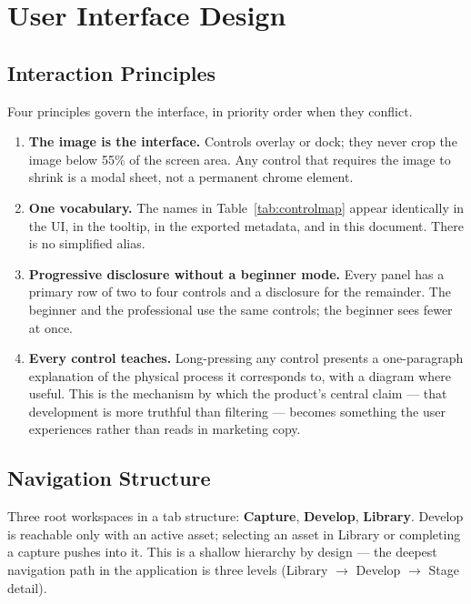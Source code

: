 \section{User Interface Design}
\label{sec:ui}

\subsection{Interaction Principles}

Four principles govern the interface, in priority order when they conflict.

\begin{enumerate}
\item \textbf{The image is the interface.} Controls overlay or dock; they never
crop the image below 55\% of the screen area. Any control that requires the
image to shrink is a modal sheet, not a permanent chrome element.
\item \textbf{One vocabulary.} The names in Table~\ref{tab:controlmap} appear
identically in the UI, in the tooltip, in the exported metadata, and in this
document. There is no simplified alias.
\item \textbf{Progressive disclosure without a beginner mode.} Every panel has
a primary row of two to four controls and a disclosure for the remainder. The
beginner and the professional use the same controls; the beginner sees fewer at
once.
\item \textbf{Every control teaches.} Long-pressing any control presents a
one-paragraph explanation of the physical process it corresponds to, with a
diagram where useful. This is the mechanism by which the product's central claim
--- that development is more truthful than filtering --- becomes something the
user experiences rather than reads in marketing copy.
\end{enumerate}

\subsection{Navigation Structure}

Three root workspaces in a tab structure: \textbf{Capture}, \textbf{Develop},
\textbf{Library}. Develop is reachable only with an active asset; selecting an
asset in Library or completing a capture pushes into it. This is a shallow
hierarchy by design --- the deepest navigation path in the application is three
levels (Library $\to$ Develop $\to$ Stage detail).


